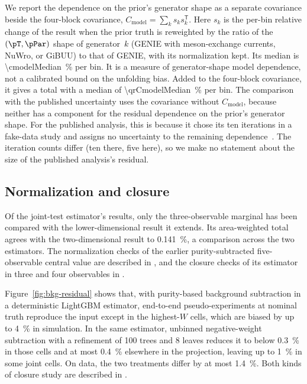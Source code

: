 We report the dependence on the prior's generator shape as a separate covariance beside the four-block covariance,
$C_{\mathrm{model}}=\sum_k s_k s_k^{\mathsf{T}}$.
Here $s_k$ is the per-bin relative change of the result when the prior truth is reweighted by the ratio of the
$(\pT,\pPar)$ shape of generator~$k$ (GENIE with meson-exchange currents, NuWro, or GiBUU) to that of GENIE, with
its normalization kept.
Its median is \SI{\cmodelMedian}{\percent} per bin.
It is a measure of generator-shape model dependence, not a calibrated bound on the unfolding bias.
Added to the four-block covariance, it gives a total with a median of \SI{\qrCmodelMedian}{\percent} per bin.
The comparison with the published uncertainty uses the covariance without $C_{\mathrm{model}}$, because neither
has a component for the residual dependence on the prior's generator shape.
For the published analysis, this is because it chose its ten iterations in a fake-data study and assigns no uncertainty to the remaining
dependence~\cite{MINERvA:2021owq}.
The iteration counts differ (ten there, five here), so we make no statement about the size of the published
analysis's residual.

\subsection{Normalization and closure}
\label{sec:closure}

Of the joint-test estimator's results, only the three-observable marginal has been compared with the
lower-dimensional result it extends.
Its area-weighted total agrees with the two-dimensional result to \SI{0.141}{\percent}, a comparison across the
two estimators.
The normalization checks of the earlier purity-subtracted five-observable central value are described in
, and the closure checks of its estimator in three and four observables in
.

Figure~\ref{fig:bkg-residual} shows that, with purity-based background subtraction in a deterministic LightGBM
estimator, end-to-end pseudo-experiments at nominal truth reproduce the input except in the highest-$W$ cells,
which are biased by up to \SI{4}{\percent} in simulation.
In the same estimator, unbinned negative-weight subtraction with a refinement of 100 trees and 8 leaves reduces it
to below \SI{0.3}{\percent} in those cells and at most \SI{0.4}{\percent} elsewhere in the projection, leaving up
to \SI{1}{\percent} in some joint cells.
On data, the two treatments differ by at most \SI{1.4}{\percent}.
Both kinds of closure study are described in .

